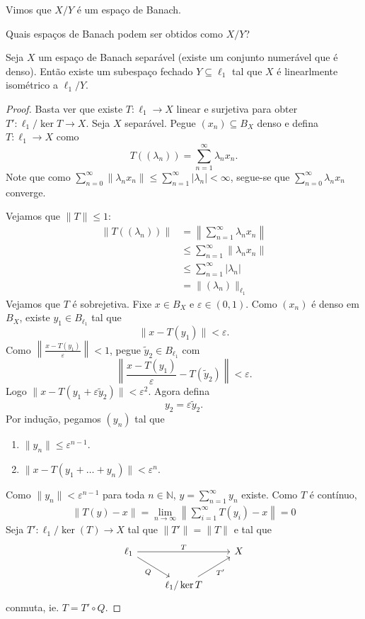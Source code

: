 \documentclass[portuguese]{article}
\theoremstyle{definition}
\newcommand{\N}{\mathbb{N}}
\begin{document}
	Vimos que $X/Y$ é um espaço de Banach.
	\begin{pregunta}
		Quais espaços de Banach podem ser obtidos como $X/Y$?
	\end{pregunta}
	\begin{teo}
		Seja $X$ um espaço de Banach separável (existe um conjunto numerável que é denso). Então existe um subespaço fechado $Y\subseteq\ell_1$ tal que $X$ é linearlmente isométrico a $\ell_1/Y$.
	\end{teo}
	\begin{proof}
		Basta ver que existe $T:\ell_1\to X$ linear e surjetiva para obter $T':\ell_1/\ker T\to X$. Seja $X$ separável. Pegue $(x_n)\subseteq B_X$ denso e defina $T:\ell_1\to X$ como
		\[T\left((\lambda_n)\right)=\sum_{n=1}^\infty \lambda_nx_n.\]
		Note que como $\sum_{n=0}^\infty\|\lambda_nx_n\|\leq\sum_{n=1}^\infty|\lambda_n|<\infty$, segue-se que $\sum_{n=0}^\infty\lambda_nx_n$ converge.
		
		Vejamos que $\| T\|\leq1$:
		\begin{align*}
			\| T((\lambda_n))\|&=\left\|\sum_{n=1}^\infty\lambda_nx_n\right\|\\
			&\leq \sum_{n=1}^\infty\| \lambda_nx_n\|\\
			&\leq \sum_{n=1}^\infty|\lambda_n|\\
			&=\| (\lambda_n)\|_{\ell_1}
		\end{align*}
		Vejamos que $T$ é sobrejetiva. Fixe $x\in B_X$ e $\varepsilon\in(0,1)$. \iffalse Como $(x_n)$ é denso em $B_X$, existe $n_0\in\N$ tal que $\| x-x_{n_0}\|<\varepsilon$. Para cualquer $(\lambda_n)\in\ell_1$,
		\[\| x-T(\lambda_n)\|=\left\| x-\sum_{n=1}^\infty \lambda_nx_n\right\|\leq\left\| \sum_{n\neq n_0}x-\lambda_nx_n\right\|+\| x-\lambda_{n_0}x_{n_0}\|\]\fi
		Como $(x_n)$ é denso em $B_X$, {\color{orange}existe} $y_1\in B_{\ell_1}$ tal que
		\[\| x-T(y_1)\|<\varepsilon.\]
		Como $\left\| \frac{x-T(y_1)}{\varepsilon}\right\|<1$, pegue $\tilde{y}_2\in B_{\ell_1}$ com
		\[\left\|\frac{x-T(y_1)}{\varepsilon}-T(\tilde{y}_2)\right\|<\varepsilon.\]
		Logo $\| x-T(y_1+\varepsilon\tilde{y}_2)\|<\varepsilon^2$.
		Agora defina
		\[y_2=\varepsilon\tilde{y}_2.\]
		Por indução, pegamos $(y_n)$ tal que
		\begin{enumerate}
			\item $\| y_n\|\leq\varepsilon^{n-1}$.
			\item $\| x-T(y_1+\ldots+y_n)\|<\varepsilon^n$.
		\end{enumerate}
		Como $\| y_n\|<\varepsilon^{n-1}$ para toda $n\in\N$, $y=\sum_{n=1}^\infty y_n$ existe. Como $T$ é contínuo,
		\begin{align*}
			\| T(y)-x\|=\lim_{n\to\infty}\left\|\sum_{i=1}^\infty T(y_i)-x\right\|=0
		\end{align*}
		Seja $T':\ell_1/\ker(T)\to X$ tal que $\| T'\|=\| T\|$ e tal que
		\[\begin{tikzcd}
			\ell_1\arrow[dr,"Q",swap]\arrow[rr,"T"]&&X\\
			&\ell_1/\ker T\arrow[ur,"T'",swap]
		\end{tikzcd}\]
		conmuta, ie. $T=T'\circ Q$.
		

\end{proof}
\end{document}
